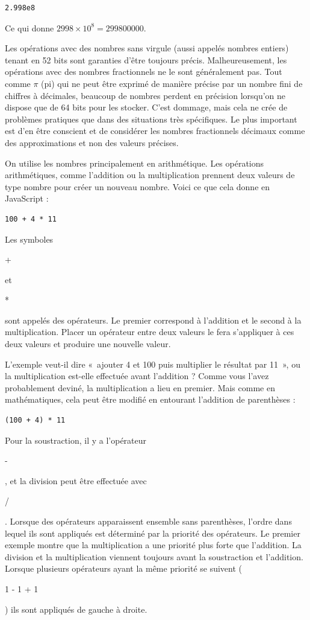 \documentclass{FramateX}
\renewcommand{\texttt}[1]{\begin{sffamily}{#1}\end{sffamily}}
\begin{document}
\begin{lstlisting}
2.998e8
\end{lstlisting}
Ce qui donne $2998 \times 10^8 = 299800000$.

Les opérations avec des nombres sans virgule (aussi appelés nombres
entiers) tenant en 52 bits sont garanties d'être toujours précis.
Malheureusement, les opérations avec des nombres fractionnels ne le sont
généralement pas. Tout comme $\pi$ (pi) qui ne peut être exprimé de manière précise par un nombre fini de chiffres à décimales, beaucoup de nombres perdent en précision lorsqu'on ne dispose que de 64 bits pour les stocker. C'est dommage, mais cela ne crée de problèmes pratiques que dans des situations très spécifiques. Le plus important est d'en être conscient et de considérer les nombres fractionnels décimaux comme des approximations et non des valeurs précises.


\begin{center}\end{center}

On utilise les nombres principalement en arithmétique. Les opérations
arithmétiques, comme l'addition ou la multiplication prennent deux
valeurs de type nombre pour créer un nouveau nombre. Voici ce que cela
donne en JavaScript :

\begin{lstlisting}
100 + 4 * 11
\end{lstlisting}
Les symboles \texttt{+} et \texttt{*} sont appelés des opérateurs. Le
premier correspond à l'addition et le second à la multiplication. Placer
un opérateur entre deux valeurs le fera s'appliquer à ces deux valeurs
et produire une nouvelle valeur.

L'exemple veut-il dire «~ajouter 4 et 100 puis multiplier le résultat
par 11~», ou la multiplication est-elle effectuée avant l'addition ?
Comme vous l'avez probablement deviné, la multiplication a lieu en
premier. Mais comme en mathématiques, cela peut être modifié en
entourant l'addition de parenthèses :

\begin{lstlisting}
(100 + 4) * 11
\end{lstlisting}
Pour la soustraction, il y a l'opérateur \texttt{-}, et la division peut
être effectuée avec \texttt{/}. Lorsque des opérateurs apparaissent
ensemble sans parenthèses, l'ordre dans lequel ils sont appliqués est
déterminé par la priorité des opérateurs. Le premier exemple montre que
la multiplication a une priorité plus forte que l'addition. La division
et la multiplication viennent toujours avant la soustraction et
l'addition. Lorsque plusieurs opérateurs ayant la même priorité se
suivent (\texttt{1 - 1 + 1}) ils sont appliqués de gauche à droite.
\end{document}
